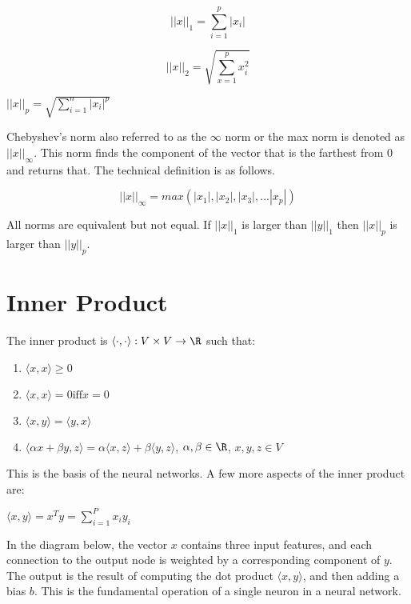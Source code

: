 \centering
$$||x||_1 = \sum_{i=1}^{p}|x_i|$$

$$||x||_2 = \sqrt{\sum_{x=1}^{p}x_i^2}$$

$||x||_p = \sqrt{\sum_{i=1}^{n}|x_i|^p}$

\raggedright

Chebyshev's norm also referred to as the $\infty$ norm or the max norm is denoted as $||x||_\infty$. This norm finds the component of the vector that is the farthest from 0 and returns that. The technical definition is as follows.

$$||x||_\infty = max(|x_1|, |x_2|, |x_3|, ... |x_p|)$$

All norms are equivalent but not equal. If $||x||_1$ is larger than $||y||_1$ then $||x||_p$ is larger than $||y||_p$.

\section{Inner Product}

The inner product is $\langle\cdot,\cdot\rangle: V \times V \rightarrow\R$ such that:

\begin{enumerate}
	\item $\langle x,x \rangle \geq 0$
	\item $\langle x,x \rangle = 0 \text{iff} x=0$
	\item $\langle x,y \rangle = \langle y,x \rangle$
	\item $\langle \alpha x+ \beta y,z \rangle = \alpha \langle x,z \rangle + \beta \langle y,z 			\rangle$,				$\alpha,\beta \in \R$,
			$x,y,z \in V$
\end{enumerate}

This is the basis of the neural networks. A few more aspects of the inner product are:

\vspace{0.8em} 

$\langle x,y \rangle = x^T y = \sum_{i=1}^{P}x_i y_i$

\vspace{1em} 

In the diagram below, the vector $x$ contains three input features, and each connection
to the output node is weighted by a corresponding component of $y$. The output is the
result of computing the dot product $\langle x, y \rangle$, and then adding a bias $b$. 
This is the fundamental operation of a single neuron in a neural network.


